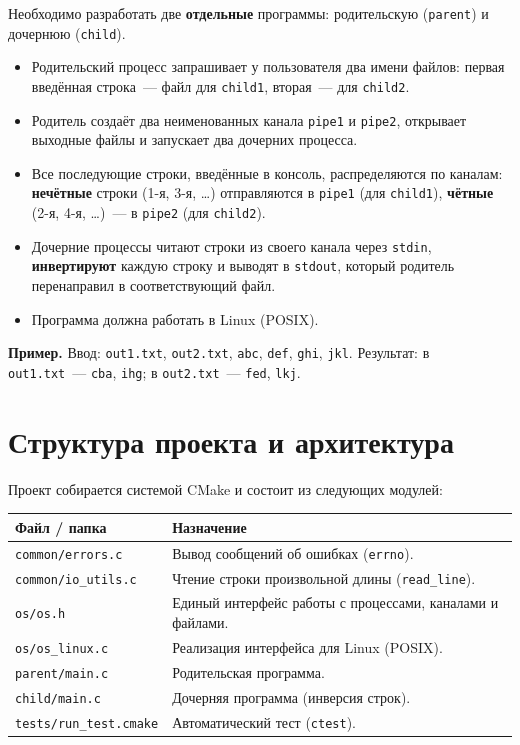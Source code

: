 \documentclass[11pt, a4paper]{article}
\begin{document}
Необходимо разработать две \textbf{отдельные} программы: родительскую
(\texttt{parent}) и дочернюю (\texttt{child}).

\begin{itemize}[noitemsep]
  \item Родительский процесс запрашивает у пользователя два имени файлов:
        первая введённая строка~--- файл для \texttt{child1}, вторая~--- для \texttt{child2}.
  \item Родитель создаёт два неименованных канала \texttt{pipe1} и \texttt{pipe2},
        открывает выходные файлы и запускает два дочерних процесса.
  \item Все последующие строки, введённые в консоль, распределяются по
        каналам: \textbf{нечётные} строки (1-я, 3-я, \dots) отправляются в
        \texttt{pipe1} (для \texttt{child1}), \textbf{чётные} (2-я, 4-я, \dots)~---
        в \texttt{pipe2} (для \texttt{child2}).
  \item Дочерние процессы читают строки из своего канала через \texttt{stdin},
        \textbf{инвертируют} каждую строку и выводят в \texttt{stdout}, который
        родитель перенаправил в соответствующий файл.
  \item Программа должна работать в Linux (POSIX).
\end{itemize}

\textbf{Пример.} Ввод: \texttt{out1.txt}, \texttt{out2.txt}, \texttt{abc}, \texttt{def},
\texttt{ghi}, \texttt{jkl}. Результат: в \texttt{out1.txt}~--- \texttt{cba}, \texttt{ihg};
в \texttt{out2.txt}~--- \texttt{fed}, \texttt{lkj}.

\section{Структура проекта и архитектура}

Проект собирается системой CMake и состоит из следующих модулей:

\begin{center}
\begin{tabular}{@{}p{4.2cm}p{10cm}@{}}
\toprule
\textbf{Файл / папка} & \textbf{Назначение}\\
\midrule
\texttt{common/\allowbreak{}errors.c} & Вывод сообщений об ошибках (\texttt{errno}).\\
\texttt{common/\allowbreak{}io\_\allowbreak{}utils.c} & Чтение строки произвольной длины (\texttt{read\_\allowbreak{}line}).\\
\texttt{os/\allowbreak{}os.h} & Единый интерфейс работы с процессами, каналами и файлами.\\
\texttt{os/\allowbreak{}os\_\allowbreak{}linux.c} & Реализация интерфейса для Linux (POSIX).\\
\texttt{parent/\allowbreak{}main.c} & Родительская программа.\\
\texttt{child/\allowbreak{}main.c} & Дочерняя программа (инверсия строк).\\
\texttt{tests/\allowbreak{}run\_\allowbreak{}test.cmake} & Автоматический тест (\texttt{ctest}).\\
\bottomrule
\end{tabular}
\end{center}
\end{document}

